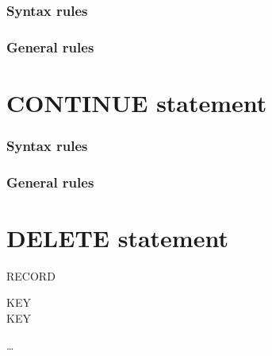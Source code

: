 \subsubsection{Syntax rules}

\subsubsection{General rules}

\section{CONTINUE statement}

\begin{syntax}
\end{syntax}

\subsubsection{Syntax rules}

\subsubsection{General rules}

\section{DELETE statement}

\begin{syntax}
   \filename RECORD

  \begin{0-1}
  \end{0-1}

  \begin{0+}
     KEY \imperativestatement \\
      KEY \imperativestatement
  \end{0+}

  \begin{0-1}
  \end{0-1}
\end{syntax}

\begin{syntax}[\miscextcolour]
   
  \begin{1=}
    \filename
  \end{1=} \ldots
\end{syntax}

